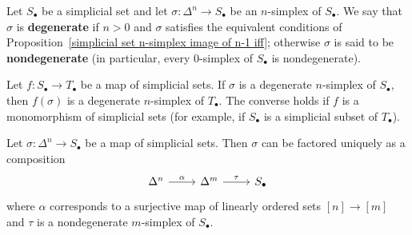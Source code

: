 Let $S_\bullet$ be a simplicial set and let $\sigma:\Delta^n\to S_\bullet$ be an $n$-simplex of $S_\bullet$. We say that $\sigma$ is \textbf{degenerate} if $n>0$ and $\sigma$ satisfies the equivalent conditions of Proposition~\ref{simplicial set n-simplex image of n-1 iff}; otherwise $\sigma$ is said to be \textbf{nondegenerate} (in particular, every $0$-simplex of $S_\bullet$ is nondegenerate).
\begin{example}
Let $f:S_\bullet\to T_\bullet$ be a map of simplicial sets. If $\sigma$ is a degenerate $n$-simplex of $S_\bullet$, then $f(\sigma)$ is a degenerate $n$-simplex of $T_\bullet$. The converse holds if $f$ is a monomorphism of simplicial sets (for example, if $S_\bullet$ is a simplicial subset of $T_\bullet$).
\end{example}
\begin{proposition}\label{simplicial set map from Delta^n factorization}
Let $\sigma:\Delta^n\to S_\bullet$ be a map of simplicial sets. Then $\sigma$ can be factored uniquely as a composition
\[\begin{tikzcd}
\Delta^n\ar[r,"\alpha"]&\Delta^m\ar[r,"\tau"]&S_\bullet
\end{tikzcd}\]
where $\alpha$ corresponds to a surjective map of linearly ordered sets $[n]\to[m]$ and $\tau$ is a nondegenerate $m$-simplex of $S_\bullet$.
\end{proposition}
